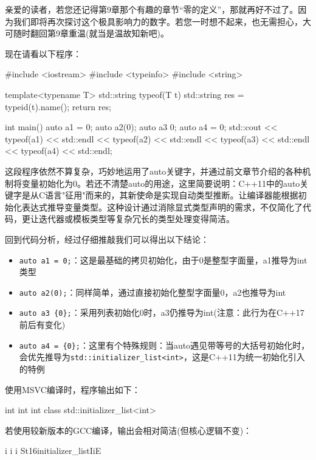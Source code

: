 
亲爱的读者，若您还记得第9章那个有趣的章节“零的定义”，那就再好不过了。因为我们即将再次探讨这个极具影响力的数字。若您一时想不起来，也无需担心，大可随时翻回第9章重温(就当是温故知新吧)。

现在请看以下程序：

\begin{cpp}
#include <iostream>
#include <typeinfo>
#include <string>

template<typename T> std::string typeof(T t) {
  std::string res = typeid(t).name();
  return res;
}

int main() {
  auto a1 = 0;
  auto a2(0);
  auto a3 {0};
  auto a4 = {0};
  std::cout << typeof(a1) << std::endl
            << typeof(a2) << std::endl
            << typeof(a3) << std::endl
            << typeof(a4) << std::endl;
}
\end{cpp}

这段程序依然不算复杂，巧妙地运用了auto关键字，并通过前文章节介绍的各种机制将变量初始化为0。若还不清楚auto的用途，这里简要说明：C++11中的auto关键字是从C语言"征用"而来的，其新使命是实现自动类型推断。让编译器能根据初始化表达式推导变量类型。这种设计通过消除显式类型声明的需求，不仅简化了代码，更让迭代器或模板类型等复杂冗长的类型处理变得简洁。

回到代码分析，经过仔细推敲我们可以得出以下结论：

\begin{itemize}
\item 
\verb|auto a1 = 0;|：这是最基础的拷贝初始化，由于0是整型字面量，a1推导为int类型

\item 
\verb|auto a2(0);|：同样简单，通过直接初始化整型字面量0，a2也推导为int

\item 
\verb|auto a3 {0};|：采用列表初始化{0}时，a3仍推导为int(注意：此行为在C++17前后有变化)

\item 
\verb|auto a4 = {0};|：这里有个特殊规则：当auto遇见带等号的大括号初始化时，会优先推导为\verb|std::initializer_list<int>|，这是C++11为统一初始化引入的特例
\end{itemize}

使用MSVC编译时，程序输出如下：

\begin{shell}
int
int
int
class std::initializer_list<int>
\end{shell}

若使用较新版本的GCC编译，输出会相对简洁(但核心逻辑不变)：

\begin{shell}
i 
i 
i
St16initializer_listIiE
\end{shell}

